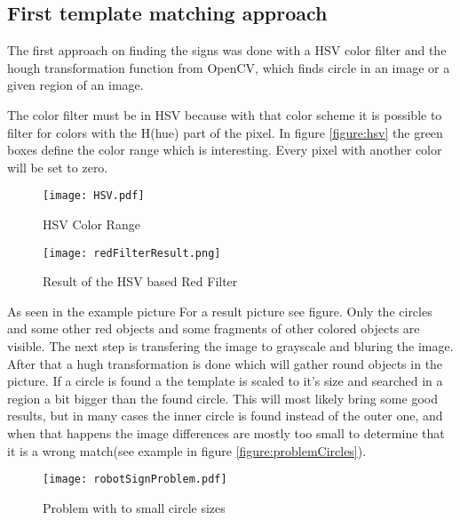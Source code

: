 \subsection{First template matching approach}
The first approach on finding the signs was done with a HSV color filter and the hough transformation
function from OpenCV, which finds circle in an image or a given region of an image.

The color filter must be in HSV because with that color scheme it is possible to filter for colors
with the H(hue) part of the pixel. In figure \vref{figure:hsv} the green boxes define the color range
which is interesting. Every pixel with another color will be set to zero. 

\begin{figure}[H]
\begin{center}
  \texttt{[image: HSV.pdf]}
  \caption{HSV Color Range}
  \label{figure:hsv}
\end{center}
\end{figure}


\begin{figure}[H]
\begin{center}
  \texttt{[image: redFilterResult.png]}
  \caption{Result of the HSV based Red Filter}
  \label{figure:redFilter}
\end{center}
\end{figure}


As seen in the example picture For a result picture see 
figure. Only the circles and some other red objects and some fragments of
other colored objects are visible. The next step is transfering the image to grayscale and 
bluring the image. After that a hugh transformation is done which will gather round
objects in the picture. If a circle is found a the template is scaled to it's size and 
searched in a region a bit bigger than the found circle.
\newpage
This will most likely bring some good results, but in many cases the inner circle is found
instead of the outer one, and when that happens the image differences are mostly too small
to determine that it is a wrong match(see example in figure \vref{figure:problemCircles}).

\begin{figure}[H]
\begin{center}
  \texttt{[image: robotSignProblem.pdf]}
  \caption{Problem with to small circle sizes}
  \label{figure:problemCircles}
\end{center}
\end{figure}

